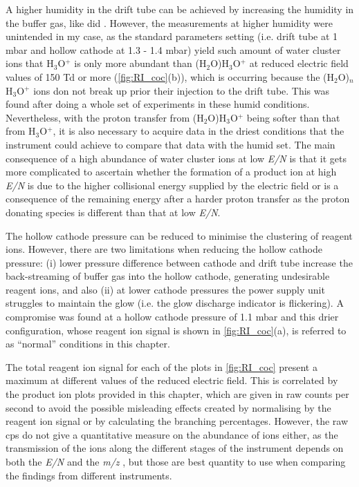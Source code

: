 A higher humidity in the drift tube can be achieved by increasing the humidity in the buffer gas, like \citeauthor{malaskova2019compendium} did \cite{malaskova2019compendium}. However, the measurements at higher humidity were unintended in my case, as the standard parameters setting (i.e. drift tube at 1 mbar and hollow cathode at 1.3 - 1.4 mbar)  yield such amount of water cluster ions that H$_3$O$^+$ is only more abundant than  (H$_2$O)H$_3$O$^+$ at reduced electric field values of 150 Td or more (\autoref{fig:RI_coc}(b)), which is occurring because the (H$_2$O)$_n$H$_3$O$^+$ ions don not break up prior their injection to the drift tube. This was found after doing a whole set of experiments in these humid conditions.
%
 Nevertheless, with the proton transfer from (H$_2$O)H$_3$O$^+$ being softer than that from H$_3$O$^+$, it is also necessary to acquire data in the driest conditions that the instrument could achieve to compare that data with the humid set. 
The main consequence of a high abundance of water cluster ions at low \textit{E/N} is that it gets more complicated to ascertain whether the formation of a product ion at high \textit{E/N} is due to the higher collisional energy supplied by the electric field or is a consequence of the remaining energy after a harder proton transfer as the proton donating species is different than that at low \textit{E/N}.

The hollow cathode pressure can be reduced to minimise the clustering of reagent ions.
  However, there are two limitations when reducing the hollow cathode pressure: (i) lower pressure difference between cathode and drift tube increase the back-streaming of buffer gas  into the hollow cathode, generating undesirable reagent ions, and also (ii) at lower cathode pressures the  power supply unit struggles to maintain the glow (i.e. the glow discharge indicator is flickering). 
%
A compromise was found at a hollow cathode pressure of 1.1 mbar and this drier configuration, whose reagent ion signal is shown in \autoref{fig:RI_coc}(a), is referred to as ``normal'' conditions in this chapter.
%

The total reagent ion signal for each of the plots in \autoref{fig:RI_coc} present a maximum  at different values of the reduced electric field. This is correlated by the product ion plots provided in this chapter, which are given in raw counts per second to avoid the possible misleading effects created by normalising by the reagent ion signal or by calculating the branching percentages.
%
However, the raw cps do not give a quantitative measure on the abundance of ions  either, as the transmission of the ions along the different stages of the instrument depends on both the \textit{E/N} and the \textit{m/z} , but those are best quantity to use when comparing the findings from different instruments.



